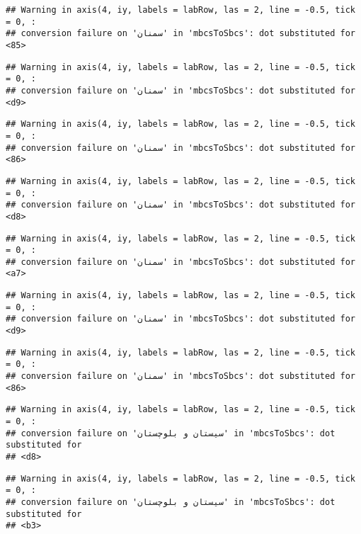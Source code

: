 \documentclass[
]{article}
\begin{document}
\begin{verbatim}
## Warning in axis(4, iy, labels = labRow, las = 2, line = -0.5, tick = 0, :
## conversion failure on 'سمنان' in 'mbcsToSbcs': dot substituted for <85>
\end{verbatim}

\begin{verbatim}
## Warning in axis(4, iy, labels = labRow, las = 2, line = -0.5, tick = 0, :
## conversion failure on 'سمنان' in 'mbcsToSbcs': dot substituted for <d9>
\end{verbatim}

\begin{verbatim}
## Warning in axis(4, iy, labels = labRow, las = 2, line = -0.5, tick = 0, :
## conversion failure on 'سمنان' in 'mbcsToSbcs': dot substituted for <86>
\end{verbatim}

\begin{verbatim}
## Warning in axis(4, iy, labels = labRow, las = 2, line = -0.5, tick = 0, :
## conversion failure on 'سمنان' in 'mbcsToSbcs': dot substituted for <d8>
\end{verbatim}

\begin{verbatim}
## Warning in axis(4, iy, labels = labRow, las = 2, line = -0.5, tick = 0, :
## conversion failure on 'سمنان' in 'mbcsToSbcs': dot substituted for <a7>
\end{verbatim}

\begin{verbatim}
## Warning in axis(4, iy, labels = labRow, las = 2, line = -0.5, tick = 0, :
## conversion failure on 'سمنان' in 'mbcsToSbcs': dot substituted for <d9>
\end{verbatim}

\begin{verbatim}
## Warning in axis(4, iy, labels = labRow, las = 2, line = -0.5, tick = 0, :
## conversion failure on 'سمنان' in 'mbcsToSbcs': dot substituted for <86>
\end{verbatim}

\begin{verbatim}
## Warning in axis(4, iy, labels = labRow, las = 2, line = -0.5, tick = 0, :
## conversion failure on 'سیستان و بلوچستان' in 'mbcsToSbcs': dot substituted for
## <d8>
\end{verbatim}

\begin{verbatim}
## Warning in axis(4, iy, labels = labRow, las = 2, line = -0.5, tick = 0, :
## conversion failure on 'سیستان و بلوچستان' in 'mbcsToSbcs': dot substituted for
## <b3>
\end{verbatim}
\end{document}
